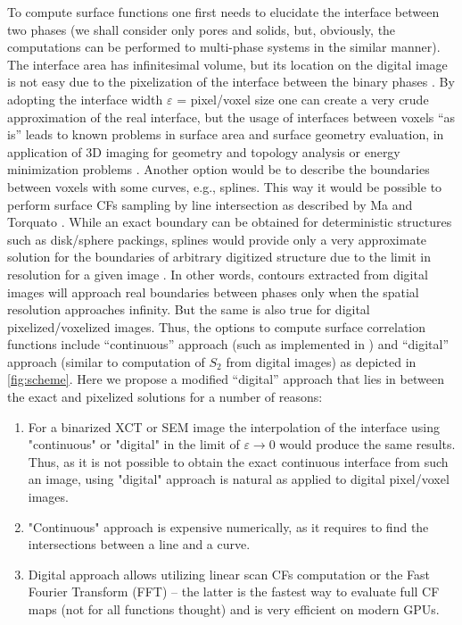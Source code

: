 \documentclass[reprint,amsmath,amssymb,aps,pre,showkeys,showpacs]{revtex4-1}
\begin{document}
To compute surface functions one first needs to elucidate the interface between
two phases (we shall consider only pores and solids, but, obviously, the
computations can be performed to multi-phase systems in the similar manner). The
interface area has infinitesimal volume, but its location on the digital image
is not easy due to the pixelization of the interface between the binary phases
\cite{ma2018SS}. By adopting the interface width $\varepsilon$ = pixel/voxel
size one can create a very crude approximation of the real interface, but the
usage of interfaces between voxels ``as is'' leads to known problems in surface
area and surface geometry evaluation, in application of 3D imaging for geometry
and topology analysis \cite{AWR_PNM,PNM_Morse} or energy minimization problems
\cite{frank2018energy}. Another option would be to describe the boundaries
between voxels with some curves, e.g., splines. This way it would be possible to
perform surface CFs sampling by line intersection as described by Ma and
Torquato \cite{ma2018SS}. While an exact boundary can be obtained for
deterministic structures such as disk/sphere packings, splines would provide
only a very approximate solution for the boundaries of arbitrary digitized
structure due to the limit in resolution for a given image
\cite{gerke2012tomographic}. In other words, contours extracted from digital
images will approach real boundaries between phases only when the spatial
resolution approaches infinity. But the same is also true for digital
pixelized/voxelized images. Thus, the options to compute surface correlation
functions include ``continuous'' approach (such as implemented in
\cite{ma2018SS}) and ``digital'' approach (similar to computation of $S_2$ from
digital images) as depicted in \cref{fig:scheme}. Here we propose a modified
``digital'' approach that lies in between the exact and pixelized solutions for
a number of reasons:
\begin{enumerate}
  \item For a binarized XCT or SEM image the interpolation of the interface
    using "continuous" or "digital" in the limit of $\varepsilon \to 0$ would
    produce the same results. Thus, as it is not possible to obtain the exact
    continuous interface from such an image, using "digital" approach is natural
    as applied to digital pixel/voxel images.
  \item "Continuous" approach is expensive numerically, as it requires to find the
    intersections between a line and a curve.
  \item Digital approach allows utilizing linear scan CFs computation or the
    Fast Fourier Transform (FFT) -- the latter is the fastest way to evaluate
    full CF maps (not for all functions thought) and is very efficient on modern
    GPUs.
\end{enumerate}
\end{document}
